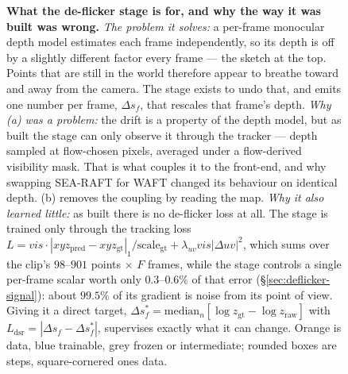 \begin{figure}[!tbp]
\begin{tikzpicture}
\end{tikzpicture}
\caption{\textbf{What the de-flicker stage is for, and why the way it was built was wrong.}
  \emph{The problem it solves:} a per-frame monocular depth model estimates each frame
  independently, so its depth is off by a
  slightly different factor every frame --- the sketch at the top. Points that are still in the
  world therefore appear to breathe toward and away from the camera. The stage exists to undo that,
  and emits one number per frame, $\Delta s_f$, that rescales that frame's depth.
  \emph{Why (a) was a problem:} the drift is a property of the depth model, but as built the stage
  can only observe it through the tracker --- depth sampled at flow-chosen pixels, averaged under a
  flow-derived visibility mask. That is what couples it to the front-end, and why swapping SEA-RAFT
  for WAFT changed its behaviour on identical depth. (b) removes the coupling by reading the map.
  \emph{Why it also learned little:} as built there is no de-flicker loss at all. The stage is
  trained only through the tracking loss
  $L=vis\cdot|xyz_{\text{pred}}-xyz_{\text{gt}}|_1/\text{scale}_{\text{gt}}+\lambda_{uv}vis|\Delta
  uv|^2$, which sums over the clip's $98$--$901$ points $\times$ $F$ frames, while the stage controls a single
  per-frame scalar worth only $0.3$--$0.6\%$ of that error (\S\ref{sec:deflicker-signal}): about
  $99.5\%$ of its gradient is noise from its point of view. Giving it a direct target,
  $\Delta s^{*}_f=\mathrm{median}_n[\log z_{\text{gt}}-\log z_{\text{raw}}]$ with
  $L_{\text{dsr}}=|\Delta s_f-\Delta s^{*}_f|$, supervises exactly what it can change.
  Orange is data, blue trainable, grey frozen or intermediate; rounded boxes are steps,
  square-cornered ones data.}
\label{fig:deflicker-coupling}
\end{figure}
